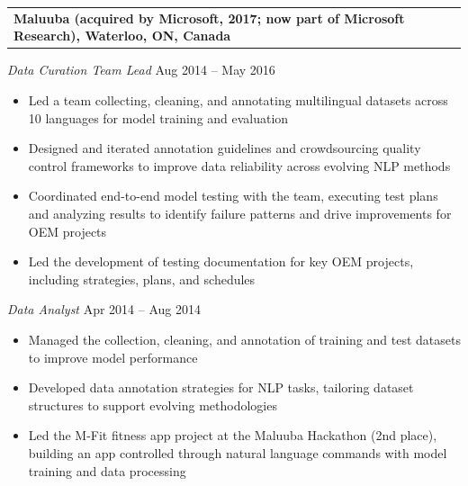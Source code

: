 \documentclass[10.5pt,letterpaper]{article}
\makeatletter
\newcommand{\entrydate}[2]{%
  \noindent\begin{tabularx}{\textwidth}{@{}X r@{}}
    \textbf{#1} & #2
  \end{tabularx}\vspace{-2pt}%
}
\makeatother
\begin{document}
\entrydate{Maluuba (acquired by Microsoft, 2017; now part of Microsoft Research), Waterloo, ON, Canada}{ }

\noindent\textit{Data Curation Team Lead} \hfill Aug 2014 -- May 2016
\begin{itemize}[leftmargin=14pt, nosep, topsep=2pt]
  \item Led a team collecting, cleaning, and annotating multilingual datasets across 10 languages for model training and evaluation
  \item Designed and iterated annotation guidelines and crowdsourcing quality control frameworks to improve data reliability across evolving NLP methods
  \item Coordinated end-to-end model testing with the team, executing test plans and analyzing results to identify failure patterns and drive improvements for OEM projects
  \item Led the development of testing documentation for key OEM projects, including strategies, plans, and schedules
\end{itemize}
\vspace{2pt}

\noindent\textit{Data Analyst} \hfill Apr 2014 -- Aug 2014
\begin{itemize}[leftmargin=14pt, nosep, topsep=2pt]
  \item Managed the collection, cleaning, and annotation of training and test datasets to improve model performance
  \item Developed data annotation strategies for NLP tasks, tailoring dataset structures to support evolving methodologies
  \item Led the M-Fit fitness app project at the Maluuba Hackathon (2nd place), building an app controlled through natural language commands with model training and data processing
\end{itemize}
\end{document}
